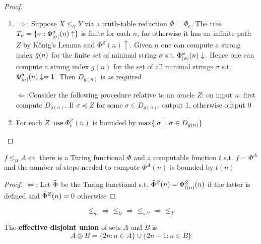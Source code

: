 \documentclass[11pt]{article}
\DeclareMathOperator{\use}{\textsf{use}}
\begin{document}
\begin{proof}
\begin{enumerate}
\item \(\Rightarrow\): Suppose \(X\le_{tt}Y\) via a truth-table reduction \(\Phi=\Phi_e\). The
tree \(T_n=\{\sigma:\Phi^\sigma_{\abs{\sigma}}(n)\uparrow\}\) is finite for each \(n\), for otherwise it has an infinite
path \(Z\) by Kőnig's Lemma and \(\Phi^Z(n)\uparrow\). Given \(n\) one can compute a strong
index \(\tilde{g}(n)\) for the finite set of minimal string \(\sigma\) s.t. \(\Phi_{\abs{\sigma}}^\sigma(n)\downarrow\). Hence
one can compute a strong index \(g(n)\) for the set of all minimal strings \(\sigma\)
s.t. \(\Phi_{\abs{\sigma}}^\sigma(n)\downarrow=1\). Then \(D_{g(n)}\) is as required

\(\Leftarrow\):Consider the following procedure relative to an oracle \(Z\): on input \(n\), first
compute \(D_{g(n)}\). If \(\sigma\preceq Z\) for some \(\sigma\in D_{g(n)}\), output 1, otherwise output 0

\item For each \(Z\) \(\use\Phi_e^Z(n)\) is bounded by \(\max\{\abs{\sigma}:\sigma\in D_{g(n)}\}\)
\end{enumerate}
\end{proof}

\begin{proposition}[]
\label{1.2.22}
\(f\le_{tt}A\Leftrightarrow\) there is a Turing functional \(\Phi\) and a computable function \(t\) s.t. \(f=\Phi^A\) and
the number of steps needed to compute \(\Phi^A(n)\) is bounded by \(t(n)\)
\end{proposition}

\begin{proof}
\(\Leftarrow\): Let \(\tilde{\Phi}\) be the Turing functional s.t. \(\tilde{\Phi}^Z(n)=\Phi^Z_{t(n)}(n)\) if the
latter is defined and \(\tilde{\Phi}^Z(n)=0\) otherwise
\end{proof}

\begin{equation*}
\le_m\Rightarrow\le_{tt}\Rightarrow\le_{wtt}\Rightarrow\le_T
\end{equation*}

\begin{definition}[]
The \textbf{effective disjoint union} of sets \(A\) and \(B\) is
\begin{equation*}
A\oplus B=\{2n:n\in A\}\cup\{2n+1:n\in B\}
\end{equation*}
\end{definition}
\end{document}

